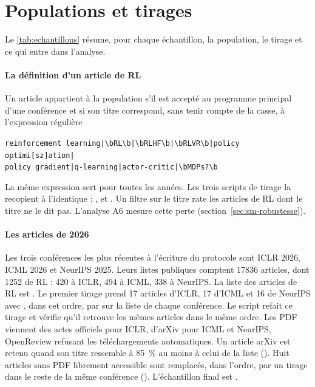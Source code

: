\section{Populations et tirages}\label{sec:sm-tirages}

Le \cref{tab:echantillons} résume, pour chaque échantillon, la population, le tirage et ce qui entre
dans l'analyse.

\paragraph{La définition d'un article de RL}
Un article appartient à la population s'il est accepté au programme principal d'une conférence et si
son titre correspond, sans tenir compte de la casse, à l'expression régulière
\begin{center}
\small\verb!reinforcement learning|\bRL\b|\bRLHF\b|\bRLVR\b|policy optimi[sz]ation|!\\
\small\verb!policy gradient|q-learning|actor-critic|\bMDPs?\b!
\end{center}
La même expression sert pour toutes les années. Les trois scripts de tirage la recopient à
l'identique :
,  et . Un filtre sur le titre rate les
articles de RL dont le titre ne le dit pas. L'analyse A6 mesure cette perte
(section~\ref{sec:sm-robustesse}).

\paragraph{Les articles de 2026}
Les trois conférences les plus récentes à l'écriture du protocole sont ICLR 2026, ICML 2026 et NeurIPS 2025.
Leurs listes publiques comptent \num{17836} articles, dont \num{1252} de RL : 420 à ICLR, 494 à ICML,
338 à NeurIPS. La liste des articles de RL est . Le premier tirage prend 17 articles d'ICLR,
17 d'ICML et 16 de NeurIPS avec , dans cet ordre, par
 sur la liste de chaque conférence. Le script  refait ce
tirage et vérifie qu'il retrouve les mêmes articles dans le même ordre. Les PDF viennent des actes
officiels pour ICLR, d'arXiv pour ICML et NeurIPS, OpenReview refusant les téléchargements
automatiques. Un article arXiv est retenu quand son titre ressemble à 85~\% au moins à celui de la
liste (). Huit articles sans PDF librement accessible sont remplacés, dans
l'ordre, par un tirage  dans le reste de la même conférence
(). L'échantillon final est .

